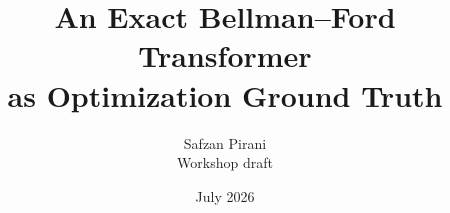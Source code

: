 \title{\vspace{-1.4em}\bfseries
An Exact Bellman--Ford Transformer\\[0.1em]
as Optimization Ground Truth}
\author{Safzan Pirani\\[0.2em]
{\normalsize Workshop draft}}
\date{July 2026}
